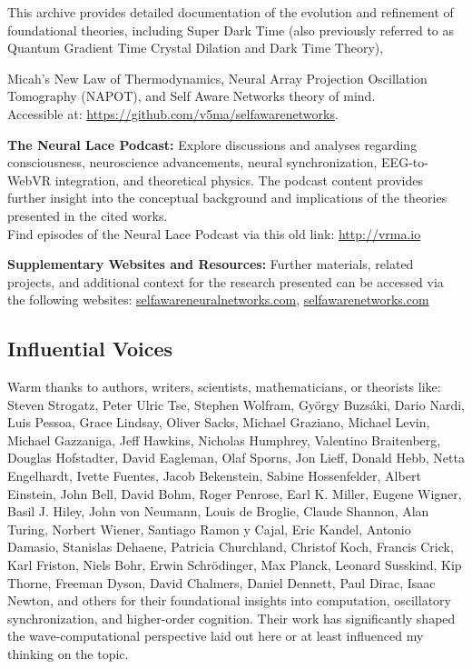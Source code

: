 This archive provides detailed documentation of the evolution and refinement of foundational theories, including Super Dark Time (also previously referred to as Quantum Gradient Time Crystal Dilation and Dark Time Theory),

Micah's New Law of Thermodynamics, Neural Array Projection Oscillation Tomography (NAPOT), and Self Aware Networks theory of mind.\\Accessible at: \href{https://github.com/v5ma/selfawarenetworks}{https://github.com/v5ma/selfawarenetworks}.

\medskip
\noindent \textbf{The Neural Lace Podcast:} Explore discussions and analyses regarding consciousness, neuroscience advancements, neural synchronization, EEG-to-WebVR integration, and theoretical physics. The podcast content provides further insight into the conceptual background and implications of the theories presented in the cited works.\\Find episodes of the Neural Lace Podcast via this old link: \href{http://vrma.io}{http://vrma.io}

\medskip

\noindent \textbf{Supplementary Websites and Resources:} Further materials, related projects, and additional context for the research presented can be accessed via the following websites: \href{http://selfawareneuralnetworks.com}{selfawareneuralnetworks.com}, \href{http://selfawarenetworks.com}{selfawarenetworks.com}

\subsection{Influential Voices}
Warm thanks to authors, writers, scientists, mathematicians, or theorists like: Steven Strogatz, 
Peter Ulric Tse, Stephen Wolfram, Gy\"orgy Buzs\'aki, Dario Nardi, Luis Pessoa, Grace Lindsay, 
Oliver Sacks, Michael Graziano, Michael Levin, Michael Gazzaniga, Jeff Hawkins, Nicholas Humphrey, 
Valentino Braitenberg, Douglas Hofstadter, David Eagleman, Olaf Sporns, Jon Lieff, Donald Hebb, 
Netta Engelhardt, Ivette Fuentes, Jacob Bekenstein, Sabine Hossenfelder, Albert Einstein, John Bell, 
David Bohm, Roger Penrose, Earl K. Miller, Eugene Wigner, Basil J. Hiley, John von Neumann, 
Louis de Broglie, Claude Shannon, Alan Turing, Norbert Wiener, Santiago Ramon y Cajal, Eric Kandel, 
Antonio Damasio, Stanislas Dehaene, Patricia Churchland, Christof Koch, Francis Crick, 
Karl Friston, Niels Bohr, Erwin Schr\"odinger, Max Planck, Leonard Susskind, Kip Thorne, 
Freeman Dyson, David Chalmers, Daniel Dennett, Paul Dirac, Isaac Newton, and others for their 
foundational insights into computation, oscillatory synchronization, and higher-order cognition. 
Their work has significantly shaped the wave-computational perspective laid out here or at least 
influenced my thinking on the topic.

